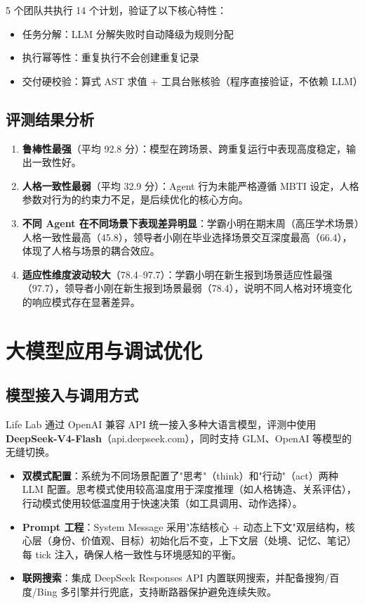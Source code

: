 \documentclass[12pt,a4paper]{article}%
\begin{document}
5 个团队共执行 14 个计划，验证了以下核心特性：
\begin{itemize}
	\item 任务分解：LLM 分解失败时自动降级为规则分配
	\item 执行幂等性：重复执行不会创建重复记录
	\item 交付硬校验：算式 AST 求值 + 工具台账核验（程序直接验证，不依赖 LLM）
\end{itemize}

\subsection{评测结果分析}

\begin{enumerate}
	\item \textbf{鲁棒性最强}（平均 92.8 分）：模型在跨场景、跨重复运行中表现高度稳定，输出一致性好。
	\item \textbf{人格一致性最弱}（平均 32.9 分）：Agent 行为未能严格遵循 MBTI 设定，人格参数对行为的约束力不足，是后续优化的核心方向。
	\item \textbf{不同 Agent 在不同场景下表现差异明显}：学霸小明在期末周（高压学术场景）人格一致性最高（45.8），领导者小刚在毕业选择场景交互深度最高（66.4），体现了人格与场景的耦合效应。
	\item \textbf{适应性维度波动较大}（78.4--97.7）：学霸小明在新生报到场景适应性最强（97.7），领导者小刚在新生报到场景最弱（78.4），说明不同人格对环境变化的响应模式存在显著差异。
\end{enumerate}

\section{大模型应用与调试优化}

\subsection{模型接入与调用方式}

Life Lab 通过 OpenAI 兼容 API 统一接入多种大语言模型，评测中使用 \textbf{DeepSeek-V4-Flash}（api.deepseek.com），同时支持 GLM、OpenAI 等模型的无缝切换。

\begin{itemize}
	\item \textbf{双模式配置}：系统为不同场景配置了"思考"（think）和"行动"（act）两种 LLM 配置。思考模式使用较高温度用于深度推理（如人格铸造、关系评估），行动模式使用较低温度用于快速决策（如工具调用、动作选择）。
	\item \textbf{Prompt 工程}：System Message 采用"冻结核心 + 动态上下文"双层结构，核心层（身份、价值观、目标）初始化后不变，上下文层（处境、记忆、笔记）每 tick 注入，确保人格一致性与环境感知的平衡。
	\item \textbf{联网搜索}：集成 DeepSeek Responses API 内置联网搜索，并配备搜狗/百度/Bing 多引擎并行兜底，支持断路器保护避免连续失败。
\end{itemize}
\end{document}
